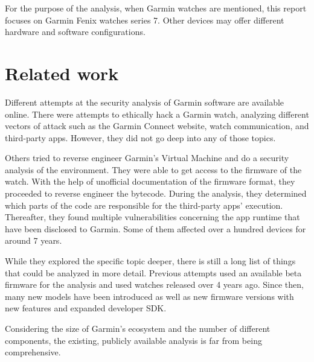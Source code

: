 For the purpose of the analysis, when Garmin watches are mentioned, this report focuses on Garmin Fenix watches series 7.
Other devices may offer different hardware and software configurations.


\section{Related work}

Different attempts at the security analysis of Garmin software are available online.
There were attempts to ethically hack a Garmin watch\cite{kth-ethical-hacking,kth-audit}, analyzing different vectors of attack such as the Garmin Connect website, watch communication, and third-party apps.
However, they did not go deep into any of those topics.

Others tried to reverse engineer Garmin’s Virtual Machine and do a security analysis of the environment\cite{broken-vm,compromising-garmin-watches}.
They were able to get access to the firmware of the watch.
With the help of unofficial documentation of the firmware format\cite{firmware-format}, they proceeded to reverse engineer the bytecode.
During the analysis, they determined which parts of the code are responsible for the third-party apps' execution.
Thereafter, they found multiple vulnerabilities concerning the app runtime that have been disclosed to Garmin.
Some of them affected over a hundred devices for around 7 years.

While they explored the specific topic deeper, there is still a long list of things that could be analyzed in more detail.
Previous attempts used an available beta firmware for the analysis and used watches released over 4 years ago.
Since then, many new models have been introduced as well as new firmware versions with new features and expanded developer SDK.

Considering the size of Garmin's ecosystem and the number of different components, the existing, publicly available analysis is far from being comprehensive.